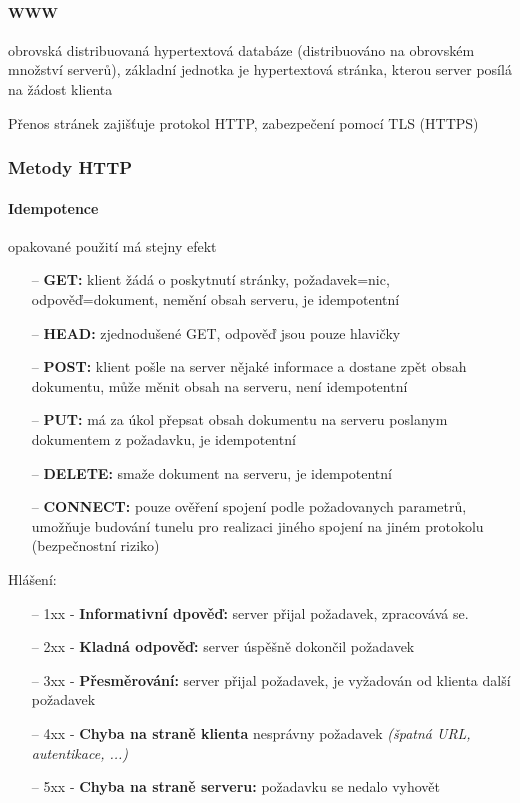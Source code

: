 \documentclass[10pt,a4paper]{article}
\begin{document}
\paragraph{WWW} obrovská distribuovaná hypertextová databáze (distribuováno na obrovském množství serverů), základní jednotka je hypertextová stránka, kterou server posílá na žádost klienta

Přenos stránek zajišťuje protokol HTTP, zabezpečení pomocí TLS (HTTPS)

\subsubsection{Metody HTTP}


\paragraph{Idempotence} opakované použití má stejny efekt

\begin{itemize}
    \item[--] \textbf{GET:} klient žádá o poskytnutí stránky, požadavek=nic, odpověď=dokument, nemění obsah serveru, je idempotentní
    \item[--] \textbf{HEAD:} zjednodušené GET, odpověď jsou pouze hlavičky
    \item[--] \textbf{POST:} klient pošle na server nějaké informace a dostane zpět obsah dokumentu, může měnit obsah na serveru, není idempotentní
    \item[--] \textbf{PUT:} má za úkol přepsat obsah dokumentu na serveru poslanym dokumentem z požadavku, je idempotentní
    \item[--] \textbf{DELETE:} smaže dokument na serveru, je idempotentní
    \item[--] \textbf{CONNECT:} pouze ověření spojení podle požadovanych parametrů, umožňuje budování tunelu pro realizaci jiného spojení na jiném protokolu (bezpečnostní riziko)
\end{itemize}

Hlášení: 
\begin{itemize}
    \item[--] 1xx - \textbf{Informativní dpověď:} server přijal požadavek, zpracovává se.
    \item[--] 2xx - \textbf{Kladná odpověď:} server úspěšně dokončil požadavek
    \item[--] 3xx - \textbf{Přesměrování:} server přijal požadavek, je vyžadován od klienta další požadavek
    \item[--] 4xx - \textbf{Chyba na straně klienta} nesprávny požadavek \textit{(špatná URL, autentikace, ...)}
    \item[--] 5xx - \textbf{Chyba na straně serveru:} požadavku se nedalo vyhovět
\end{itemize}
\end{document}
